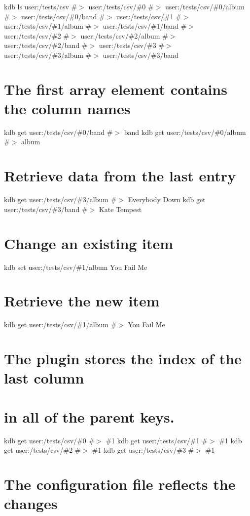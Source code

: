 kdb ls user\+:/tests/csv \#$>$ user\+:/tests/csv/\#0 \#$>$ user\+:/tests/csv/\#0/album \#$>$ user\+:/tests/csv/\#0/band \#$>$ user\+:/tests/csv/\#1 \#$>$ user\+:/tests/csv/\#1/album \#$>$ user\+:/tests/csv/\#1/band \#$>$ user\+:/tests/csv/\#2 \#$>$ user\+:/tests/csv/\#2/album \#$>$ user\+:/tests/csv/\#2/band \#$>$ user\+:/tests/csv/\#3 \#$>$ user\+:/tests/csv/\#3/album \#$>$ user\+:/tests/csv/\#3/band\hypertarget{autotoc_md122_autotoc_md130}{}\section{The first array element contains the column names}\label{autotoc_md122_autotoc_md130}
kdb get user\+:/tests/csv/\#0/band \#$>$ band kdb get user\+:/tests/csv/\#0/album \#$>$ album\hypertarget{autotoc_md122_autotoc_md131}{}\section{Retrieve data from the last entry}\label{autotoc_md122_autotoc_md131}
kdb get user\+:/tests/csv/\#3/album \#$>$ Everybody Down kdb get user\+:/tests/csv/\#3/band \#$>$ Kate Tempest\hypertarget{autotoc_md122_autotoc_md132}{}\section{Change an existing item}\label{autotoc_md122_autotoc_md132}
kdb set user\+:/tests/csv/\#1/album \textquotesingle{}You Fail Me\textquotesingle{} \hypertarget{autotoc_md122_autotoc_md133}{}\section{Retrieve the new item}\label{autotoc_md122_autotoc_md133}
kdb get user\+:/tests/csv/\#1/album \#$>$ You Fail Me\hypertarget{autotoc_md122_autotoc_md134}{}\section{The plugin stores the index of the last column}\label{autotoc_md122_autotoc_md134}
\hypertarget{autotoc_md122_autotoc_md135}{}\section{in all of the parent keys.}\label{autotoc_md122_autotoc_md135}
kdb get user\+:/tests/csv/\#0 \#$>$ \#1 kdb get user\+:/tests/csv/\#1 \#$>$ \#1 kdb get user\+:/tests/csv/\#2 \#$>$ \#1 kdb get user\+:/tests/csv/\#3 \#$>$ \#1\hypertarget{autotoc_md122_autotoc_md136}{}\section{The configuration file reflects the changes}\label{autotoc_md122_autotoc_md136}
